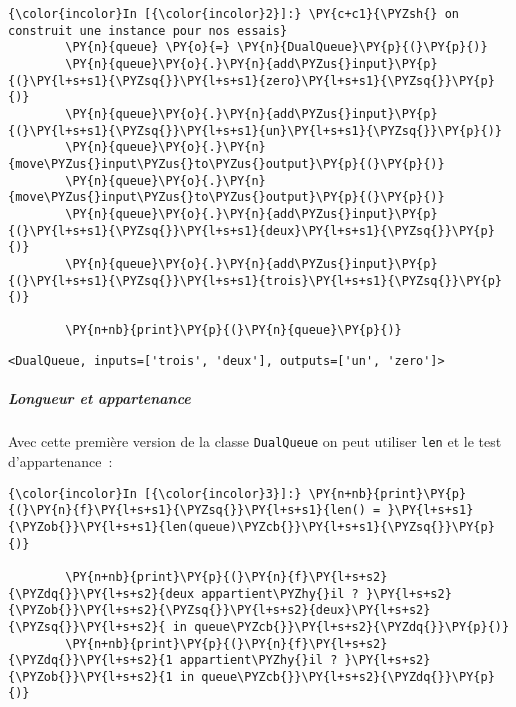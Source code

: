     \begin{Verbatim}[commandchars=\\\{\},frame=single,framerule=0.3mm,rulecolor=\color{cellframecolor}]
{\color{incolor}In [{\color{incolor}2}]:} \PY{c+c1}{\PYZsh{} on construit une instance pour nos essais}
        \PY{n}{queue} \PY{o}{=} \PY{n}{DualQueue}\PY{p}{(}\PY{p}{)}
        \PY{n}{queue}\PY{o}{.}\PY{n}{add\PYZus{}input}\PY{p}{(}\PY{l+s+s1}{\PYZsq{}}\PY{l+s+s1}{zero}\PY{l+s+s1}{\PYZsq{}}\PY{p}{)}
        \PY{n}{queue}\PY{o}{.}\PY{n}{add\PYZus{}input}\PY{p}{(}\PY{l+s+s1}{\PYZsq{}}\PY{l+s+s1}{un}\PY{l+s+s1}{\PYZsq{}}\PY{p}{)}
        \PY{n}{queue}\PY{o}{.}\PY{n}{move\PYZus{}input\PYZus{}to\PYZus{}output}\PY{p}{(}\PY{p}{)}
        \PY{n}{queue}\PY{o}{.}\PY{n}{move\PYZus{}input\PYZus{}to\PYZus{}output}\PY{p}{(}\PY{p}{)}
        \PY{n}{queue}\PY{o}{.}\PY{n}{add\PYZus{}input}\PY{p}{(}\PY{l+s+s1}{\PYZsq{}}\PY{l+s+s1}{deux}\PY{l+s+s1}{\PYZsq{}}\PY{p}{)}
        \PY{n}{queue}\PY{o}{.}\PY{n}{add\PYZus{}input}\PY{p}{(}\PY{l+s+s1}{\PYZsq{}}\PY{l+s+s1}{trois}\PY{l+s+s1}{\PYZsq{}}\PY{p}{)}
        
        \PY{n+nb}{print}\PY{p}{(}\PY{n}{queue}\PY{p}{)}
\end{Verbatim}


    \begin{Verbatim}[commandchars=\\\{\},frame=single,framerule=0.3mm,rulecolor=\color{cellframecolor}]
<DualQueue, inputs=['trois', 'deux'], outputs=['un', 'zero']>
\end{Verbatim}

    \hypertarget{longueur-et-appartenance}{%
\subparagraph{Longueur et appartenance}\label{longueur-et-appartenance}}

    Avec cette première version de la classe \texttt{DualQueue} on peut
utiliser \texttt{len} et le test d'appartenance~:

    \begin{Verbatim}[commandchars=\\\{\},frame=single,framerule=0.3mm,rulecolor=\color{cellframecolor}]
{\color{incolor}In [{\color{incolor}3}]:} \PY{n+nb}{print}\PY{p}{(}\PY{n}{f}\PY{l+s+s1}{\PYZsq{}}\PY{l+s+s1}{len() = }\PY{l+s+s1}{\PYZob{}}\PY{l+s+s1}{len(queue)\PYZcb{}}\PY{l+s+s1}{\PYZsq{}}\PY{p}{)}
        
        \PY{n+nb}{print}\PY{p}{(}\PY{n}{f}\PY{l+s+s2}{\PYZdq{}}\PY{l+s+s2}{deux appartient\PYZhy{}il ? }\PY{l+s+s2}{\PYZob{}}\PY{l+s+s2}{\PYZsq{}}\PY{l+s+s2}{deux}\PY{l+s+s2}{\PYZsq{}}\PY{l+s+s2}{ in queue\PYZcb{}}\PY{l+s+s2}{\PYZdq{}}\PY{p}{)}
        \PY{n+nb}{print}\PY{p}{(}\PY{n}{f}\PY{l+s+s2}{\PYZdq{}}\PY{l+s+s2}{1 appartient\PYZhy{}il ? }\PY{l+s+s2}{\PYZob{}}\PY{l+s+s2}{1 in queue\PYZcb{}}\PY{l+s+s2}{\PYZdq{}}\PY{p}{)}
\end{Verbatim}


